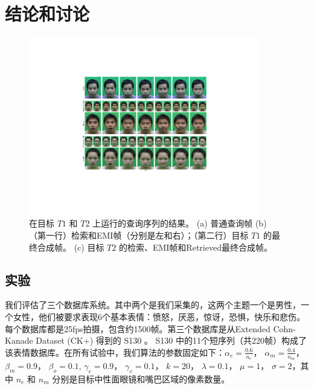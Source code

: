 \section{结论和讨论}
\begin{figure}[htbp]
\centering
    \includegraphics[width=0.9\textwidth]{data/img/likai2xf_jyy.pdf}
    \caption{在目标 $T1$ 和 $T2$ 上运行的查询序列的结果。 (a) 普通查询帧
    (b) （第一行）检索和EMI帧（分别是左和右）；（第二行）目标 $T1$ 的最终合成帧。 (c) 目标 $T2$ 的检索、EMI帧和Retrieved最终合成帧。}
    \label{fig:result12}
\end{figure}

\subsection{实验}
我们评估了三个数据库系统。其中两个是我们采集的，这两个主题一个是男性，一个女性，他们被要求表现6个基本表情：愤怒，厌恶，惊讶，恐惧，快乐和悲伤。每个数据库都是25fps拍摄，包含约1500帧。第三个数据库是从Extended Cohn-Kanade Dataset (CK+) \cite{CK+}得到的 S130 。 S130 中的11个短序列（共220帧）构成了该表情数据库。在所有试验中，我们算法的参数固定如下：$\alpha_e=\frac{0.6}{n_{e}}$， $\alpha_m=\frac{0.4}{n_m}$， $\beta_m=0.9$， $\beta_o=0.1$,
$\gamma_e=0.9$， $\gamma_v=0.1$， $k=20$， $\lambda=0.1$， $\mu=1$， $\sigma=2$，其中 $n_e$ 和 $n_m$ 分别是目标中性面眼镜和嘴巴区域的像素数量。

